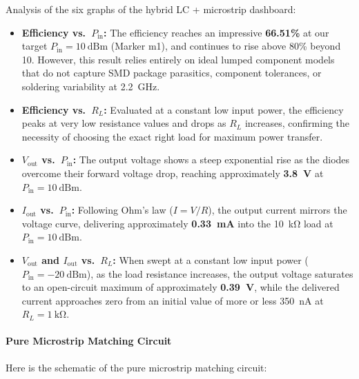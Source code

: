 Analysis of the six graphs of the hybrid LC + microstrip dashboard:
\begin{itemize}
    \item \textbf{Efficiency vs.\ $P_\mathrm{in}$:}
    The efficiency reaches an impressive \textbf{66.51\%} at our target
    $P_\mathrm{in} = \SI{10}{\text{dBm}}$ (Marker m1), and continues
    to rise above 80\% beyond \SI{10}{}.
    However, this result relies entirely on ideal lumped component
    models that do not capture SMD package parasitics, component
    tolerances, or soldering variability at \SI{2.2}{\giga\hertz}.

    \item \textbf{Efficiency vs.\ $R_L$:}
    Evaluated at a constant low input power, the efficiency peaks at
    very low resistance values and drops as $R_L$ increases,
    confirming the necessity of choosing the exact right load for
    maximum power transfer.

    \item \textbf{$V_\mathrm{out}$ vs.\ $P_\mathrm{in}$:}
    The output voltage shows a steep exponential rise as the diodes
    overcome their forward voltage drop, reaching approximately
    \textbf{\SI{3.8}{\volt}} at $P_\mathrm{in} = \SI{10}{\text{dBm}}$.

    \item \textbf{$I_\mathrm{out}$ vs.\ $P_\mathrm{in}$:}
    Following Ohm's law ($I = V/R$), the output current mirrors the
    voltage curve, delivering approximately
    \textbf{\SI{0.33}{\milli\ampere}} into the \SI{10}{\kilo\ohm} load
    at $P_\mathrm{in} = \SI{10}{\text{dBm}}$.

    \item \textbf{$V_\mathrm{out}$ and $I_\mathrm{out}$ vs.\ $R_L$:}
    When swept at a constant low input power
    ($P_\mathrm{in} = -\SI{20}{\text{dBm}}$), as the load resistance
    increases, the output voltage saturates to an open-circuit
    maximum of approximately \textbf{\SI{0.39}{\volt}}, while the
    delivered current approaches zero from an initial
    value of more or less \SI{350}{\nano\ampere} at
    $R_L = \SI{1}{\kilo\ohm}$.
\end{itemize}

\paragraph{Pure Microstrip Matching Circuit}

Here is the schematic of the pure microstrip matching circuit:

